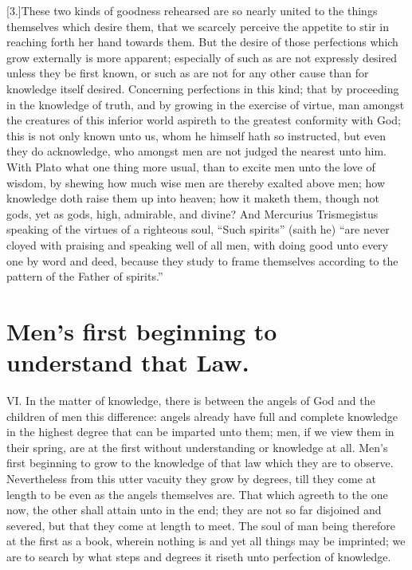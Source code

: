 [3.]These two kinds of goodness rehearsed are so nearly united to the things themselves which desire them, that we scarcely perceive the appetite to stir in reaching forth her hand towards them. But the desire of those perfections which grow externally is more apparent; especially of such as are not expressly desired unless they be first known, or such as are not for any other cause than for knowledge itself desired. Concerning perfections in this kind; that by proceeding in the knowledge of truth, and by growing in the exercise of virtue, man amongst the creatures of this inferior world aspireth to the greatest conformity with God; this is not only known unto us, whom he himself hath so instructed, but even they do acknowledge, who amongst men are not judged the nearest unto him. With Plato what one thing more usual, than to excite men unto the love of wisdom, by shewing how much wise men are thereby exalted above men; how knowledge doth raise them up into heaven; how it maketh them, though not gods, yet as gods, high, admirable, and divine? And Mercurius Trismegistus speaking of the virtues of a righteous soul, “Such spirits” (saith he) “are never cloyed with praising and speaking well of all men, with doing good unto every one by word and deed, because they study to frame themselves according to the pattern of the Father of spirits.”

\section*{Men’s first beginning to understand that Law.}

VI. In the matter of knowledge, there is between the angels of God and the children of men this difference: angels already have full and complete knowledge in the highest degree that can be imparted unto them; men, if we view them in their spring, are at the first without understanding or knowledge at all. Men’s first beginning to grow to the knowledge of that law which they are to observe. Nevertheless from this utter vacuity they grow by degrees, till they come at length to be even as the angels themselves are. That which agreeth to the one now, the other shall attain unto in the end; they are not so far disjoined and severed, but that they come at length to meet. The soul of man being therefore at the first as a book, wherein nothing is and yet all things may be imprinted; we are to search by what steps and degrees it riseth unto perfection of knowledge.

